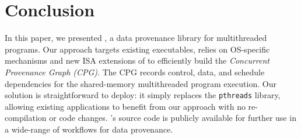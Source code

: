 \section{Conclusion}
\label{sec:conclusion}

In this paper, we presented \projecttitle, a data provenance library for multithreaded programs. Our approach targets existing executables, relies on OS-specific mechanisms and new ISA extensions of \intelpt  to efficiently build the {\em Concurrent Provenance Graph (CPG)}. The CPG records control, data, and schedule dependencies for the shared-memory multithreaded program execution. Our solution is straightforward to deploy: it simply replaces the {\tt pthreads} library, allowing existing applications to benefit from our approach with no re-compilation or code changes. \projecttitle's source code is publicly available for further use in a wide-range of workflows for data provenance. 

 
 \vspace{-5mm}
